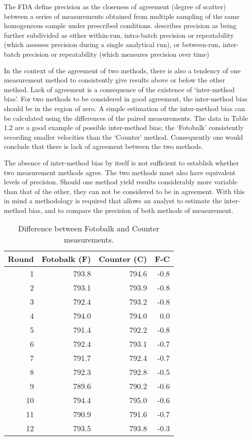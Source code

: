 \documentclass[12pt, a4paper]{report}
\begin{document}
The FDA define precision as the closeness of agreement (degree of
scatter) between a series of measurements obtained from multiple
sampling of the same homogeneous sample under prescribed
conditions. \citet{Barnhart} describes precision as being further
subdivided as either within-run, intra-batch precision or
repeatability (which assesses precision during a single analytical
run), or between-run, inter-batch precision or repeatability
(which measures precision over time)

In the context of the agreement of two methods, there is also a
tendency of one measurement method to consistently give results
above or below the other method. Lack of agreement is a
consequence of the existence of `inter-method bias'. For two
methods to be considered in good agreement, the inter-method bias
should be in the region of zero. A simple estimation of the
inter-method bias can be calculated using the differences of the
paired measurements. The data in Table 1.2 are a good example of
possible inter-method bias; the `Fotobalk' consistently recording
smaller velocities than the `Counter' method. Consequently one
would conclude that there is lack of agreement between the two
methods.

The absence of inter-method bias by itself is not sufficient to
establish whether two measurement methods agree. The two
methods must also have equivalent levels of precision. Should one
method yield results considerably more variable than that of the
other, they can not be considered to be in agreement. With this in
mind a methodology is required that allows an analyst to estimate
the inter-method bias, and to compare the precision of both
methods of measurement.
\newpage
\begin{table}[h!]
	
	\begin{center}
		
		\begin{tabular}{rrrr}
			\hline
			Round& Fotobalk (F) & Counter (C) & F-C \\
			\hline
			1 & 793.8& 794.6 & -0.8 \\
			2 & 793.1 & 793.9 & -0.8 \\
			3 & 792.4 & 793.2 & -0.8 \\
			4 & 794.0 & 794.0 & 0.0 \\
			5 & 791.4 & 792.2 & -0.8 \\
			6 & 792.4 & 793.1 & -0.7 \\
			7 & 791.7 & 792.4 & -0.7 \\
			8 & 792.3 & 792.8 & -0.5 \\
			9 & 789.6 & 790.2 & -0.6 \\
			10 & 794.4 & 795.0 & -0.6 \\
			11 & 790.9 & 791.6 & -0.7 \\
			12 & 793.5 & 793.8 & -0.3 \\
			\hline
		\end{tabular}
		\caption{Difference between Fotobalk and Counter measurements.}
	\end{center}
\end{table}
\end{document}
